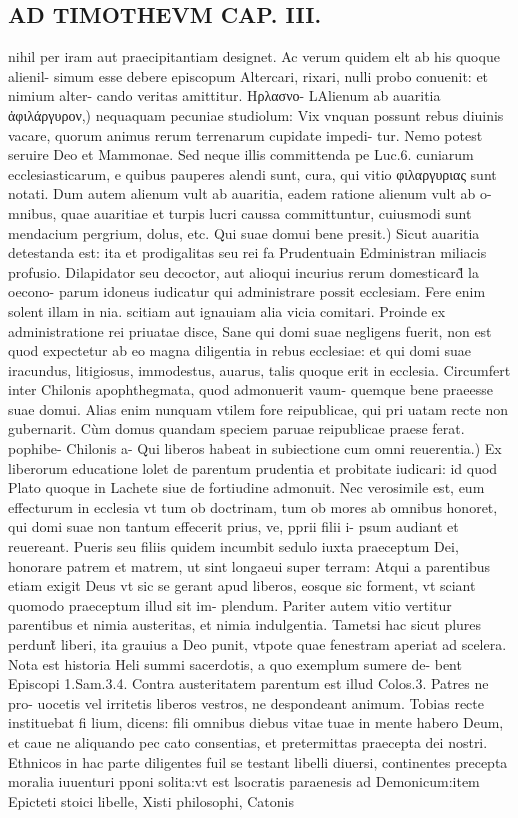 \documentclass{article}
\begin{document}
\begin{pages}
\section*{AD TIMOTHEVM CAP. III. }
\marginpar{[ p.79 ]}\pstart nihil per iram aut praecipitantiam designet. Ac verum quidem elt ab his quoque alienil- simum esse debere episcopum Altercari, rixari, nulli probo conuenit: et nimium alter- cando veritas amittitur.  \pend\pstart Hρλασνο- LAlienum ab auaritia ἀφιλάργυρον,) nequaquam pecuniae studiolum: Vix vnquan possunt rebus diuinis vacare, quorum animus rerum terrenarum cupidate impedi- tur. Nemo potest seruire Deo et Mammonae. Sed neque illis committenda pe Luc.6. cuniarum ecclesiasticarum, e quibus pauperes alendi sunt, cura, qui vitio φιλαργυριας sunt notati. Dum autem alienum vult ab auaritia, eadem ratione alienum vult ab o- mnibus, quae auaritiae et turpis lucri caussa committuntur, cuiusmodi sunt mendacium pergrium, dolus, etc.  \pend\pstart Qui suae domui bene presit.) Sicut auaritia detestanda est: ita et prodigalitas seu rei fa Prudentuain Edministran miliacis profusio. Dilapidator seu decoctor, aut alioqui incurius rerum domesticard̃ la oecono- parum idoneus iudicatur qui administrare possit ecclesiam. Fere enim solent illam in nia. scitiam aut ignauiam alia vicia comitari. Proinde ex administratione rei priuatae disce, Sane qui domi suae negligens fuerit, non est quod expectetur ab eo magna diligentia in rebus ecclesiae: et qui domi suae iracundus, litigiosus, immodestus, auarus, talis quoque  erit in ecclesia. Circumfert inter Chilonis apophthegmata, quod admonuerit vaum- quemque bene praeesse suae domui. Alias enim nunquam vtilem fore reipublicae, qui pri uatam recte non gubernarit. Cùm domus quandam speciem paruae reipublicae praese ferat. pophibe- Chilonis a-  \pend\pstart Qui liberos habeat in subiectione cum omni reuerentia.) Ex liberorum educatione lolet de parentum prudentia et probitate iudicari: id quod Plato quoque in Lachete siue de fortiudine admonuit. Nec verosimile est, eum effecturum in ecclesia vt tum ob doctrinam, tum ob mores ab omnibus honoret, qui domi suae non tantum effecerit prius, ve, pprii filii i- psum audiant et reuereant. Pueris seu filiis quidem incumbit sedulo iuxta praeceptum Dei, honorare patrem et matrem, ut sint longaeui super terram: Atqui a parentibus etiam exigit Deus vt sic se gerant apud liberos, eosque sic forment, vt sciant quomodo praeceptum illud sit im- plendum. Pariter autem vitio vertitur parentibus et nimia austeritas, et nimia indulgentia. Tametsi hac sicut plures perdunt̃ liberi, ita grauius a Deo punit, vtpote quae fenestram aperiat ad scelera. Nota est historia Heli summi sacerdotis, a quo exemplum sumere de- bent Episcopi 1.Sam.3.4. Contra austeritatem parentum est illud Colos.3. Patres ne pro- uocetis vel irritetis liberos vestros, ne despondeant animum. Tobias recte instituebat fi lium, dicens: fili omnibus diebus vitae tuae in mente habero Deum, et caue ne aliquando pec cato consentias, et pretermittas praecepta dei nostri. Ethnicos in hac parte diligentes fuil se testant libelli diuersi, continentes precepta moralia iuuenturi pponi solita:vt est lsocratis paraenesis ad Demonicum:item Epicteti stoici libelle, Xisti philosophi, Catonis 
\end{pages}
\end{document}

